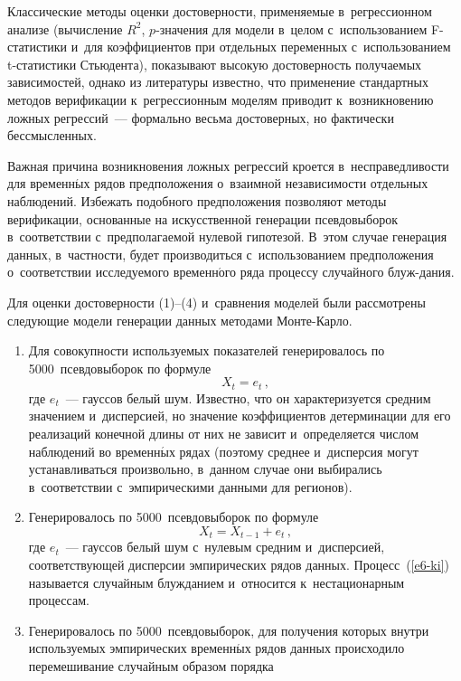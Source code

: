 \begin{multicols}{2}
  Классические методы оценки достоверности, применяемые в~регрессионном анализе 
(вычисление $R^2$,  
$p$-зна\-че\-ния для модели в~целом с~использованием F-ста\-ти\-сти\-ки и~для 
коэффициентов при\linebreak
 отдельных переменных с~использованием t-ста\-тисти\-ки 
Стьюдента), показывают высокую достоверность получаемых зависимостей, однако из 
литературы известно, что применение стандартных методов верификации 
к~регрессионным моделям приводит к~возникновению ложных регрессий~--- формально 
весьма достоверных, но фактически бессмысленных.
  
  Важная причина возникновения ложных регрессий кроется в~несправедливости для 
временн$\acute{\mbox{ы}}$х рядов предположения о~взаимной не\-за\-ви\-си\-мости\linebreak
 отдельных наблюдений. 
Избежать подобного предположения позволяют методы верификации, основанные на 
искусственной генерации псевдовыборок в~соответствии с~предполагаемой нулевой 
\mbox{гипотезой}. В~этом случае генерация данных, в~част\-ности, будет производиться 
с~использованием предположения о~соответствии исследуемого временн$\acute{\mbox{о}}$го ряда 
процессу случайного блуж-\linebreak дания.
  
  Для оценки достоверности (1)--(4) и~сравнения моделей были рассмотрены 
следующие модели генерации данных методами Монте-Карло.
  \begin{enumerate}[1.]
  \item Для совокупности используемых показателей генерировалось по 
5000~псевдовыборок по формуле
  \begin{equation}
  X_t=e_t\,,
  \label{e5-ki}
  \end{equation}
  где $e_t$~--- гауссов белый шум. Известно, что он характеризуется средним значением 
и~дисперсией, но значение коэффициентов детерминации для его реализаций конечной 
длины от них не зависит и~определяется числом наблюдений во временн$\acute{\mbox{ы}}$х рядах 
(поэтому среднее и~дисперсия могут устанавливаться произвольно, в~данном случае они 
выбирались в~соответствии с~эмпирическими данными для регионов).
  
  \item Генерировалось по 5000~псевдовыборок по формуле
  \begin{equation}X_t=X_{t-1}+e_t\,,
  \label{e6-ki}
  \end{equation}
  где $e_t$~--- гауссов белый шум с~нулевым средним и~дисперсией, соответствующей 
дисперсии эмпирических рядов данных. Процесс~(\ref{e6-ki}) называется случайным 
блужданием и~относится к~нестационарным процессам.
  \item Генерировалось по 5000~псевдовыборок, для получения которых внутри 
используемых эмпирических временн$\acute{\mbox{ы}}$х рядов данных происходило перемешивание 
случайным образом порядка\linebreak\vspace*{-12pt}


\end{enumerate}
\end{multicols}
